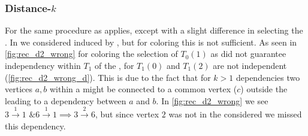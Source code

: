 	\subsubsection{Distance-$k$}
	For \DK the same procedure as \DONE applies, except with a slight difference in selecting the \subgraph. In \DONE we considered \subgraphs induced by \levelGroups, but for \DK coloring this is not sufficient. As seen in \cref{fig:rec_d2_wrong} for \DTWO coloring the selection of $T_0(1)$ as \subgraph did not guarantee \DTWO independency within \levelGroup $T_1$ of the \subgraph, for \eg $T_1(0)$ and $T_1(2)$ are not \DTWO independent (\cf \cref{fig:rec_d2_wrong_d}). This is due to the fact that for $k>1$ dependencies two vertices $a,b$ within a \subgraph might be connected to a common vertex ($c$) outside the \subgraph leading to a \DK dependency between $a$ and $b$. In \cref{fig:rec_d2_wrong} we see 	$3 \xrightarrow{1} 1 \text{ \& } 6 \xrightarrow{1} 1 	\implies 3 \xrightarrow{2} 6$, but since vertex $2$ was not in the \subgraph considered we missed this dependency. 

